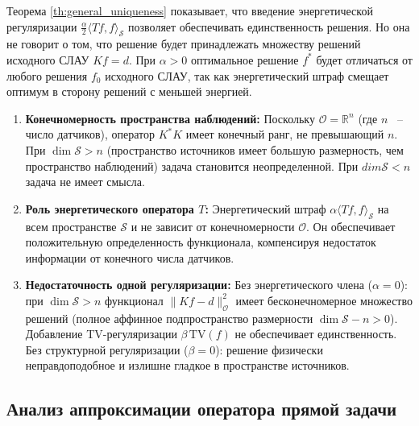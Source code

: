 \documentclass[a4paper,14pt,oneside,openany]{extarticle}
\begin{document}
\begin{remark}
Теорема \ref{th:general_uniqueness} показывает, что введение энергетической регуляризации 
$\frac{\alpha}{2}\langle Tf, 
f\rangle_{\mathcal{S}}$ позволяет обеспечивать единственность решения. Но она не говорит о том,
что решение будет принадлежать множеству решений исходного СЛАУ $Kf=d$. 
При $\alpha > 0$ оптимальное решение $f^*$ будет отличаться от любого решения $f_0$ исходного СЛАУ, 
так как энергетический штраф смещает оптимум в сторону решений с меньшей энергией.

\begin{enumerate}
    \item \textbf{Конечномерность пространства наблюдений:}
    Поскольку $\mathcal{O} = \mathbb{R}^n$ (где $n$ ~-- число датчиков),
    оператор $K^*K$ имеет конечный ранг, не превышающий $n$. При $\dim \mathcal{S} > n$
    (пространство источников имеет большую размерность, чем пространство наблюдений) 
    задача становится неопределенной. При $dim \mathcal{S} < n$ задача не имеет смысла.
    \item \textbf{Роль энергетического оператора $T$:}
    Энергетический штраф $\alpha \langle Tf, f\rangle_{\mathcal{S}}$ 
    на всем пространстве $\mathcal{S}$ и не зависит от конечномерности $\mathcal{O}$. 
    Он обеспечивает положительную определенность функционала, 
    компенсируя недостаток информации от конечного числа датчиков.
    
    \item \textbf{Недостаточность одной регуляризации:} 
    Без энергетического члена ($\alpha=0$): при $\dim \mathcal{S} > n$ функционал $\|Kf-d\|_{\mathcal{O}}^2$ имеет 
    бесконечномерное множество решений (полное аффинное подпространство размерности 
    $\dim \mathcal{S} - n > 0$). 
    Добавление TV-регуляризации $\beta\,\mathrm{TV}(f)$ не обеспечивает единственность.
    Без структурной регуляризации ($\beta=0$): решение физически неправдоподобное и
    излишне гладкое в пространстве источников.
    
\end{enumerate}
\end{remark}

\subsection{Анализ аппроксимации оператора прямой задачи}
\end{document}
